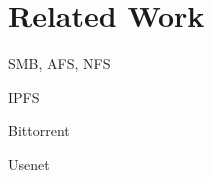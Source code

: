 \section{Related Work}\label{sec:related}

SMB, AFS, NFS\cite{eriksenCOMPARISONNFSSAMBA}

IPFS\cite{benetIPFSContentAddressed2014}

Bittorrent\cite{BittorrentP2PFileSharing,xiaSurveyBitTorrentPerformance2010}

Usenet\cite{HowUseUsenet,ohmRegulatingInternetUsenet1998}
